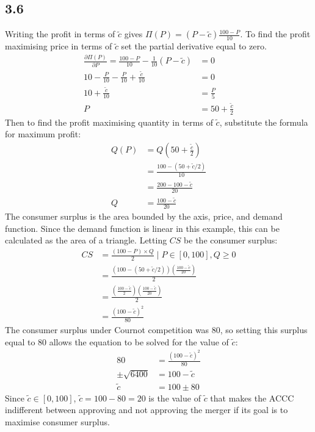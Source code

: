 \documentclass{article}
\begin{document}
\subsection*{3.6}
Writing the profit in terms of $\tilde{c}$ gives $\Pi(P) = (P - \tilde{c}) \frac{100 - P}{10}$. To find the profit maximising price in terms of $\tilde{c}$ set the partial derivative equal to zero.
\begin{align*}
    \frac{\partial \Pi(P)}{\partial P} = \frac{100 - P}{10} - \frac{1}{10} (P - \tilde{c}) &= 0\\
    10 - \frac{P}{10} - \frac{P}{10} + \frac{\tilde{c}}{10} &= 0\\
    10 + \frac{\tilde{c}}{10} &= \frac{P}{5}\\
    P &= 50 + \frac{\tilde{c}}{2}
\end{align*}
Then to find the profit maximising quantity in terms of $\tilde{c}$, substitute the formula for maximum profit:
\begin{align*}
    Q(P) &= Q \left( 50 + \frac{\tilde{c}}{2} \right)\\
    &= \frac{100 - (50 + \tilde{c}/2)}{10}\\
    &= \frac{200-100-\tilde{c}}{20}\\
    Q &= \frac{100 - \tilde{c}}{20}
\end{align*}
The consumer surplus is the area bounded by the axis, price, and demand function. Since the demand function is linear in this example, this can be calculated as the area of a triangle. Letting $CS$ be the consumer surplus:
\begin{align*}
    CS &= \frac{(100 - P) \times Q}{2} \mid P \in [0, 100], Q \geq 0\\
    &= \frac{(100 - (50 + \tilde{c} / 2)) \left( \frac{100 - \tilde{c}}{20} \right) }{2}\\
    &= \frac{\left( \frac{100 - \tilde{c}}{2} \right) \left( \frac{100 - \tilde{c}}{20} \right) }{2}\\
    &= \frac{(100 - \tilde{c})^{2}}{80}
\end{align*}
The consumer surplus under Cournot competition was 80, so setting this surplus equal to 80 allows the equation to be solved for the value of $\tilde{c}$:
\begin{align*}
    80 &= \frac{(100 - \tilde{c})^{2}}{80}\\
    \pm \sqrt{6400} &= 100 - \tilde{c}\\
    \tilde{c} &= 100 \pm 80
\end{align*}
Since $\tilde{c} \in [0, 100]$, $\tilde{c} = 100 - 80 = 20$ is the value of $\tilde{c}$ that makes the ACCC indifferent between approving and not approving the merger if its goal is to maximise consumer surplus.
\end{document}
